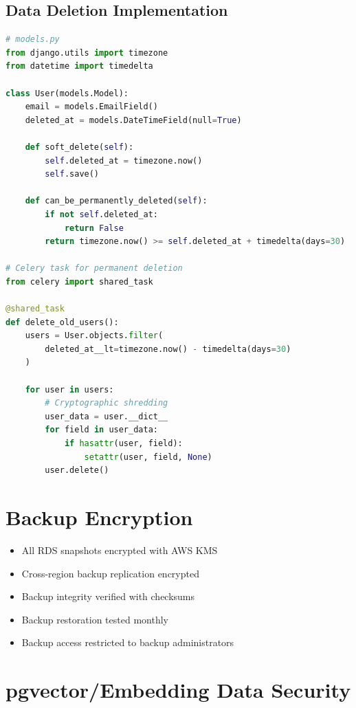 \documentclass{report}
\begin{document}
\subsection{Data Deletion Implementation}
\begin{lstlisting}[language=Python]
# models.py
from django.utils import timezone
from datetime import timedelta

class User(models.Model):
    email = models.EmailField()
    deleted_at = models.DateTimeField(null=True)
    
    def soft_delete(self):
        self.deleted_at = timezone.now()
        self.save()
    
    def can_be_permanently_deleted(self):
        if not self.deleted_at:
            return False
        return timezone.now() >= self.deleted_at + timedelta(days=30)

# Celery task for permanent deletion
from celery import shared_task

@shared_task
def delete_old_users():
    users = User.objects.filter(
        deleted_at__lt=timezone.now() - timedelta(days=30)
    )
    
    for user in users:
        # Cryptographic shredding
        user_data = user.__dict__
        for field in user_data:
            if hasattr(user, field):
                setattr(user, field, None)
        user.delete()
\end{lstlisting}

\section{Backup Encryption}

\begin{itemize}
\item All RDS snapshots encrypted with AWS KMS
\item Cross-region backup replication encrypted
\item Backup integrity verified with checksums
\item Backup restoration tested monthly
\item Backup access restricted to backup administrators
\end{itemize}

\section{pgvector/Embedding Data Security}
\end{document}
